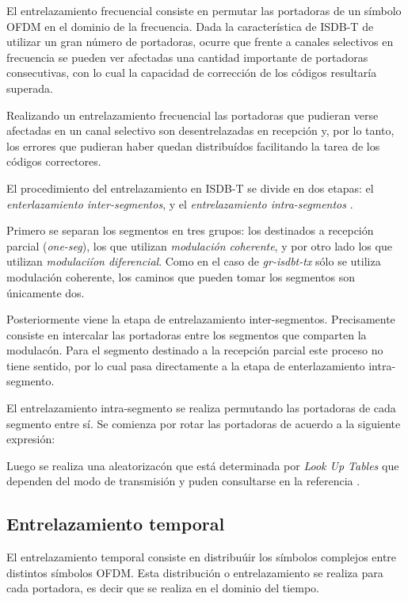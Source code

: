 El entrelazamiento frecuencial consiste en permutar las portadoras de un s\'imbolo OFDM en el dominio de la frecuencia. Dada la caracter\'istica de ISDB-T de utilizar un gran n\'umero de portadoras, ocurre que frente a canales selectivos en frecuencia se pueden ver afectadas una cantidad importante de portadoras consecutivas, con lo cual la capacidad de correcci\'on de los c\'odigos resultar\'ia superada.

Realizando un entrelazamiento frecuencial las portadoras que pudieran verse afectadas en un canal selectivo son desentrelazadas en recepci\'on y, por lo tanto, los errores que pudieran haber quedan distribu\'idos facilitando la tarea de los c\'odigos correctores.

El procedimiento del entrelazamiento en ISDB-T se divide en dos etapas: el \textit{enterlazamiento inter-segmentos}, y el \textit{entrelazamiento intra-segmentos }.

Primero se separan los segmentos en tres grupos: los destinados a recepci\'on parcial (\textit{one-seg}), los que utilizan \textit{modulaci\'on coherente}, y por otro lado los que utilizan \textit{modulaci\'ion diferencial}. Como en el caso de \textit{gr-isdbt-tx} s\'olo se utiliza modulaci\'on coherente, los caminos que pueden tomar los segmentos son \'unicamente dos.

Posteriormente viene la etapa de entrelazamiento inter-segmentos. Precisamente consiste en intercalar las portadoras entre los segmentos que comparten la modulac\'on. Para el segmento destinado a la recepci\'on parcial este proceso no tiene sentido, por lo cual pasa directamente a la etapa de enterlazamiento intra-segmento.

El entrelazamiento intra-segmento se realiza permutando las portadoras de cada segmento entre s\'i. Se comienza por rotar las portadoras de acuerdo a la siguiente expresi\'on:

Luego se realiza una aleatorizac\'on que est\'a determinada por \textit{Look Up Tables} que dependen del modo de transmisi\'on y puden consultarse en la referencia \cite{bb}.

\subsection{Entrelazamiento temporal}

El entrelazamiento temporal consiste en distribu\'uir los s\'imbolos complejos entre distintos s\'imbolos OFDM. Esta distribuci\'on o entrelazamiento se realiza para cada portadora, es decir que se realiza en el dominio del tiempo.

